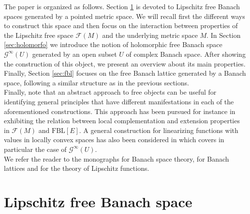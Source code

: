 \documentclass[12pt,leqno]{amsart}
\numberwithin{equation}{section} %
\theoremstyle{definition}
\numberwithin{equation}{section}
\newcommand{\fbl}{\mathrm{FBL}}
\begin{document}

The paper is organized as follows. Section \ref{sect: Lipschitz free} is devoted to Lipschitz free Banach spaces generated by a pointed metric space. We will recall first the different ways to construct this space and then focus on the interaction between properties of the Lipschitz free space $\mathcal F(M)$ and the underlying metric space $M$. In Section \ref{sec:holomorfo} we introduce the notion of holomorphic free Banach space $\mathcal G^\infty(U)$ generated by an open subset $U$ of complex Banach space. After showing the construction of this object, we present an overview about its main properties. Finally, Section \ref{sec:fbl} focuses on the free Banach lattice generated by a Banach space, following a similar structure as in the previous sections.\\

Finally, note that an abstract approach to free objects can be useful for identifying general principles that have different manifestations in each of the aforementioned constructions. This approach has been pursued for instance in \cite{AMR3} exhibiting the relation between local complementation and extension properties in $\mathcal F(M)$ and $\fbl[E]$. A general construction for linearizing functions with values in locally convex spaces has also been considered in \cite{CZ} which covers in particular the case of $\mathcal G^\infty(U)$.\\

We refer the reader to the monographs \cite{BanachSpaceTheory, LT1} for Banach space theory, \cite{LT2, M-N} for Banach lattices and \cite{BL, Weaver} for the theory of Lipschitz functions.


\section{Lipschitz free Banach space}\label{sect: Lipschitz free}
\end{document}
